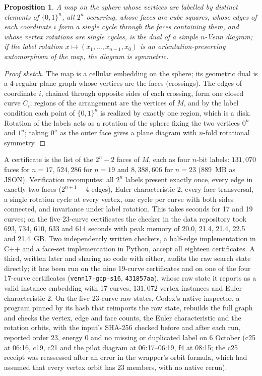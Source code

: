 \documentclass[11pt]{article}
\newtheorem{proposition}{Proposition}
\begin{document}
\begin{proposition}
A map on the sphere whose vertices are labelled by distinct elements of $\{0,1\}^n$, all $2^n$ occurring, whose
faces are cube squares, whose edges of each coordinate $i$ form a single cycle through the faces containing them,
and whose vertex rotations are single cycles, is the dual of a simple $n$-Venn diagram; if the label rotation
$x\mapsto(x_1,\dots,x_{n-1},x_0)$ is an orientation-preserving automorphism of the map, the diagram is symmetric.
\end{proposition}

\begin{proof}[Proof sketch]
The map is a cellular embedding on the sphere; its geometric dual is a 4-regular plane graph whose vertices are the
faces (crossings). The edges of coordinate $i$, chained through opposite sides of each crossing, form one closed curve
$C_i$; regions of the arrangement are the vertices of $M$, and by the label condition each point of $\{0,1\}^n$ is
realized by exactly one region, which is a disk. Rotation of the labels acts as a rotation of the sphere fixing the
two vertices $0^n$ and $1^n$; taking $0^n$ as the outer face gives a plane diagram with $n$-fold rotational symmetry.
\end{proof}

A certificate is the list of the $2^n-2$ faces of $M$, each as four $n$-bit labels: $131{,}070$ faces for $n=17$,
$524{,}286$ for $n=19$ and $8{,}388{,}606$ for $n=23$ (889~MB as JSON). Verification recomputes: all $2^n$ labels
present exactly once, every edge in exactly two faces ($2^{n+1}-4$ edges), Euler characteristic 2, every face
transversal, a single rotation cycle at every vertex, one cycle per curve with both sides connected, and invariance
under label rotation. This takes seconds for 17 and 19 curves; on the five 23-curve certificates the checker in
the data repository took 693, 734, 610, 633 and 614 seconds with peak memory of 20.0, 21.4, 21.4, 22.5 and 21.4~GB. Two independently written
checkers, a half-edge implementation in C++ and a face-set implementation in Python, accept all eighteen certificates. A
third, written later and sharing no code with either, audits the raw search state directly; it has been run on the nine
19-curve certificates and on one of the four 17-curve certificates (\texttt{venn17-gcp-s16}, \texttt{431857aa}), whose
raw state it reports as a valid instance embedding with 17 curves, $131{,}072$ vertex instances and Euler
characteristic 2. On the five 23-curve raw states, Codex's native inspector, a program pinned by its hash that
reimports the raw state, rebuilds the full graph and checks the vertex, edge and face counts, the Euler characteristic
and the rotation orbits, with the input's SHA-256 checked before and after each run, reported order 23, energy 0 and
no missing or duplicated label on 6 October (c25 at 06:16, c19, c21 and the pilot diagram at 06:17--06:19, f4 at
08:15; the c25 receipt was reassessed after an error in the wrapper's orbit formula, which had assumed that every
vertex orbit has 23 members, with no native rerun).
\end{document}
